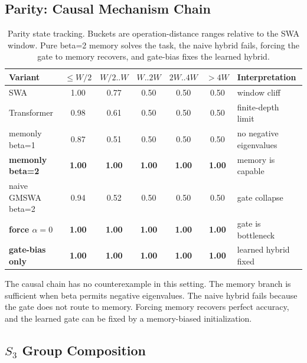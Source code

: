 \documentclass[letterpaper]{article}
\begin{document}
\subsection{Parity: Causal Mechanism Chain}

\begin{table}[t]
\centering\small
\caption{Parity state tracking. Buckets are operation-distance ranges relative to the SWA window. Pure beta=2 memory solves the task, the naive hybrid fails, forcing the gate to memory recovers, and gate-bias fixes the learned hybrid.}
\label{tab:parity}
\begin{tabular}{lccccc l}
\toprule
Variant & $\le W/2$ & $W/2..W$ & $W..2W$ & $2W..4W$ & $>4W$ & Interpretation \\
\midrule
SWA & 1.00 & 0.77 & 0.50 & 0.50 & 0.50 & window cliff \\
Transformer & 0.98 & 0.61 & 0.50 & 0.50 & 0.50 & finite-depth limit \\
memonly beta=1 & 0.87 & 0.51 & 0.50 & 0.50 & 0.50 & no negative eigenvalues \\
\textbf{memonly beta=2} & \textbf{1.00} & \textbf{1.00} & \textbf{1.00} & \textbf{1.00} & \textbf{1.00} & memory is capable \\
naive GMSWA beta=2 & 0.94 & 0.52 & 0.50 & 0.50 & 0.50 & gate collapse \\
\textbf{force $\alpha=0$} & \textbf{1.00} & \textbf{1.00} & \textbf{1.00} & \textbf{1.00} & \textbf{1.00} & gate is bottleneck \\
\textbf{gate-bias only} & \textbf{1.00} & \textbf{1.00} & \textbf{1.00} & \textbf{1.00} & \textbf{1.00} & learned hybrid fixed \\
\bottomrule
\end{tabular}
\end{table}

The causal chain has no counterexample in this setting. The memory branch is sufficient when beta permits negative eigenvalues. The naive hybrid fails because the gate does not route to memory. Forcing memory recovers perfect accuracy, and the learned gate can be fixed by a memory-biased initialization.

\subsection{$S_3$ Group Composition}
\end{document}
